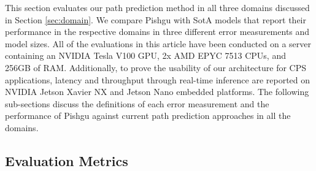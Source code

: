 \documentclass[sigconf]{acmart}
\begin{document}
This section evaluates our path prediction method in all three domains discussed in Section \ref{sec:domain}. We compare Pishgu with SotA models that report their performance in the respective domains in three different error measurements and model sizes. All of the evaluations in this article have been conducted on a server containing an NVIDIA Tesla V100 GPU, 2x AMD EPYC 7513 CPUs, and 256GB of RAM. Additionally, to prove the usability of our architecture for CPS applications, latency and throughput through real-time inference are reported on NVIDIA Jetson Xavier NX and Jetson Nano embedded platforms. The following sub-sections discuss the definitions of each error measurement and the performance of Pishgu against current path prediction approaches in all the domains.


\subsection{Evaluation Metrics}
\end{document}
